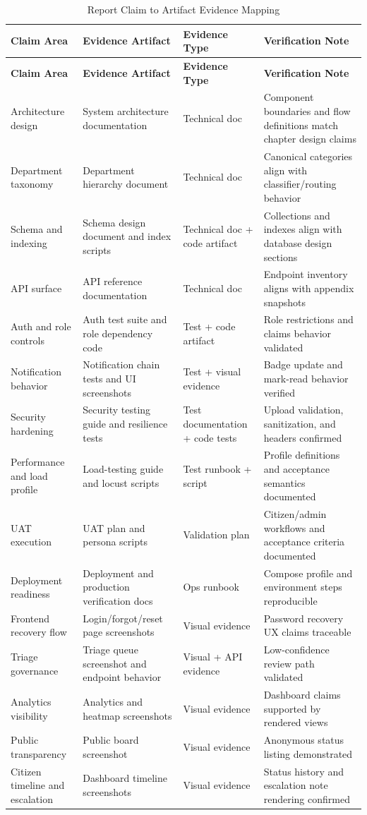 \begin{longtable}{|p{}|p{}|p{}|p{}|}
\caption{Report Claim to Artifact Evidence Mapping}
\toprule
\textbf{Claim Area} & \textbf{Evidence Artifact} & \textbf{Evidence Type} & \textbf{Verification Note} \\
\midrule
\endfirsthead
\toprule
\textbf{Claim Area} & \textbf{Evidence Artifact} & \textbf{Evidence Type} & \textbf{Verification Note} \\
\midrule
\endhead
Architecture design & System architecture documentation & Technical doc & Component boundaries and flow definitions match chapter design claims \\
Department taxonomy & Department hierarchy document & Technical doc & Canonical categories align with classifier/routing behavior \\
Schema and indexing & Schema design document and index scripts & Technical doc + code artifact & Collections and indexes align with database design sections \\
API surface & API reference documentation & Technical doc & Endpoint inventory aligns with appendix snapshots \\
Auth and role controls & Auth test suite and role dependency code & Test + code artifact & Role restrictions and claims behavior validated \\
Notification behavior & Notification chain tests and UI screenshots & Test + visual evidence & Badge update and mark-read behavior verified \\
Security hardening & Security testing guide and resilience tests & Test documentation + code tests & Upload validation, sanitization, and headers confirmed \\
Performance and load profile & Load-testing guide and locust scripts & Test runbook + script & Profile definitions and acceptance semantics documented \\
UAT execution & UAT plan and persona scripts & Validation plan & Citizen/admin workflows and acceptance criteria documented \\
Deployment readiness & Deployment and production verification docs & Ops runbook & Compose profile and environment steps reproducible \\
Frontend recovery flow & Login/forgot/reset page screenshots & Visual evidence & Password recovery UX claims traceable \\
Triage governance & Triage queue screenshot and endpoint behavior & Visual + API evidence & Low-confidence review path validated \\
Analytics visibility & Analytics and heatmap screenshots & Visual evidence & Dashboard claims supported by rendered views \\
Public transparency & Public board screenshot & Visual evidence & Anonymous status listing demonstrated \\
Citizen timeline and escalation & Dashboard timeline screenshots & Visual evidence & Status history and escalation note rendering confirmed \\
\bottomrule
\end{longtable}

